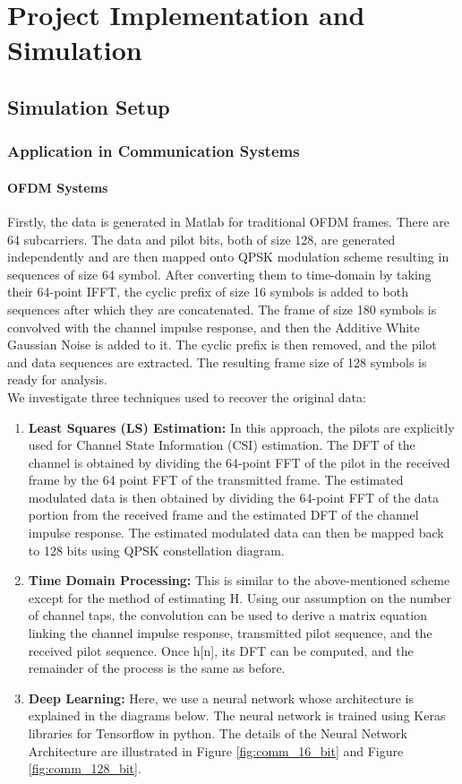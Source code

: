 
\chapter{Project Implementation and Simulation} %
\label{Chapter3}
\lhead{} %

\section{Simulation Setup}
\subsection{Application in Communication Systems}
\subsubsection{OFDM Systems}
Firstly, the data is generated in Matlab for traditional OFDM frames. There are 64 subcarriers. The data and pilot bits, both of size 128, are generated independently and are then mapped onto QPSK modulation scheme resulting in sequences of size 64 symbol. After converting them to time-domain by taking their 64-point IFFT,  the cyclic prefix of size 16 symbols is added to both sequences after which they are concatenated. The frame of size 180 symbols is convolved with the channel impulse response, and then the Additive White Gaussian Noise is added to it. The cyclic prefix is then removed, and the pilot and data sequences are extracted. The resulting frame size of 128 symbols is ready for analysis.\\
We investigate three techniques used to recover the original data:
\begin{enumerate}
\item \textbf{Least Squares (LS) Estimation:} In this approach, the pilots are explicitly used for Channel State Information (CSI) estimation. The DFT of the channel is obtained by dividing the 64-point FFT of the pilot in the received frame by the 64 point FFT of the transmitted frame. The estimated modulated data is then obtained by dividing the 64-point FFT of the data portion from the received frame and the estimated DFT of the channel impulse response. The estimated modulated data can then be mapped back to 128 bits using QPSK constellation diagram.
\item \textbf{Time Domain Processing:} This is similar to the above-mentioned scheme except for the method of estimating H. Using our assumption on the number of channel taps, the convolution can be used to derive a matrix equation linking the channel impulse response, transmitted pilot sequence, and the received pilot sequence. Once h[n], its DFT can be computed, and the remainder of the process is the same as before.
\item \textbf{Deep Learning:} Here, we use a neural network whose architecture is explained in the diagrams below. The neural network is trained using Keras libraries for Tensorflow in python.  The details of the Neural Network Architecture are illustrated in Figure \ref{fig:comm_16_bit} and Figure \ref{fig:comm_128_bit}.
\end{enumerate}

